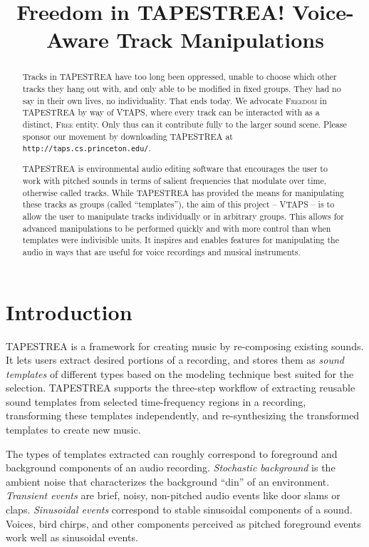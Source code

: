 \documentclass{article}
\title{Freedom in TAPESTREA! Voice-Aware Track Manipulations}
\newcommand{\noun}[1]{\textsc{#1}}
\begin{document}
\maketitle

\begin{abstract}
Tracks in TAPESTREA have too long been oppressed, unable to choose which other
tracks they hang out with, and only able to be modified in fixed groups. They
had no say in their own lives, no individuality. That ends today. We advocate
\noun{Freedom} in TAPESTREA by way of VTAPS, where every track can be
interacted with as a distinct, \noun{Free} entity. Only thus can it contribute
fully to the larger sound scene. Please sponsor our movement by downloading
TAPESTREA at \\
{\tt \small http://taps.cs.princeton.edu/}.

TAPESTREA is environmental audio editing software that encourages the user to
work with pitched sounds in terms of salient frequencies that modulate over
time, otherwise called tracks. While TAPESTREA has provided the means for
manipulating these tracks as groups (called ``templates''), the aim of this
project -- VTAPS -- is to allow the user to manipulate tracks individually or
in arbitrary groups.  This allows for advanced manipulations to be performed
quickly and with more control than when templates were indivisible units. It
inspires and enables features for manipulating the audio in ways that are
useful for voice recordings and musical instruments.

\end{abstract}

\section{Introduction}

TAPESTREA \cite{recompose} is a framework for creating music by re-composing 
existing sounds. It lets users extract desired portions of a recording, 
and stores them as {\it sound templates} of different types based on the modeling 
technique best suited for the selection. TAPESTREA supports the three-step 
workflow of extracting reusable sound templates from selected time-frequency 
regions in a recording, transforming these templates independently, and 
re-synthesizing the transformed templates to create new music.

The types of templates extracted can roughly correspond to foreground and 
background components of an audio recording. {\it Stochastic background} is the 
ambient noise that characterizes the background ``din'' of an environment. 
{\it Transient events} are brief, noisy, non-pitched audio events like door slams or 
claps. {\it Sinusoidal events} correspond to stable sinusoidal components of a sound. 
Voices, bird chirps, and other components perceived as pitched foreground events work 
well as sinusoidal events. 
\end{document}
